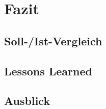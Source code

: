 \section{Fazit}
\blindtext
\subsection{Soll-/Ist-Vergleich}
\subsection{Lessons Learned}
\subsection{Ausblick}